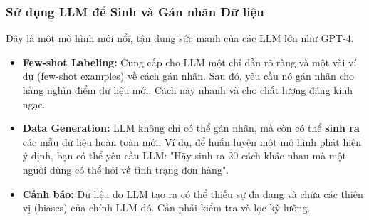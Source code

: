 \subsubsection{Sử dụng LLM để Sinh và Gán nhãn Dữ liệu}
Đây là một mô hình mới nổi, tận dụng sức mạnh của các LLM lớn như GPT-4.
\begin{itemize}
    \item \textbf{Few-shot Labeling:} Cung cấp cho LLM một chỉ dẫn rõ ràng và một vài ví dụ (few-shot examples) về cách gán nhãn. Sau đó, yêu cầu nó gán nhãn cho hàng nghìn điểm dữ liệu mới. Cách này nhanh và cho chất lượng đáng kinh ngạc.
    \item \textbf{Data Generation:} LLM không chỉ có thể gán nhãn, mà còn có thể \textbf{sinh ra} các mẫu dữ liệu hoàn toàn mới. Ví dụ, để huấn luyện một mô hình phát hiện ý định, bạn có thể yêu cầu LLM: "Hãy sinh ra 20 cách khác nhau mà một người dùng có thể hỏi về tình trạng đơn hàng".
    \item \textbf{Cảnh báo:} Dữ liệu do LLM tạo ra có thể thiếu sự đa dạng và chứa các thiên vị (biases) của chính LLM đó. Cần phải kiểm tra và lọc kỹ lưỡng.
\end{itemize}

